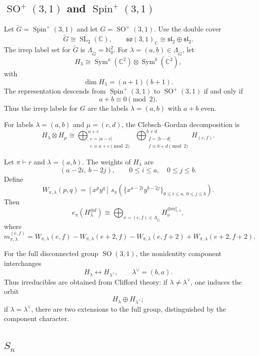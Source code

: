 \documentclass[11pt]{article}
\newcommand{\dsC}{\mathbb{C}}
\newcommand{\dsN}{\mathbb{N}}
\newcommand{\Sym}{\operatorname{Sym}}
\newcommand{\SO}{\operatorname{SO}}
\theoremstyle{definition}
\begin{document}
\subsection{\texorpdfstring{$\SO^+(3,1)$ and $\operatorname{Spin}^+(3,1)$}{SO+(3,1) and Spin+(3,1)}}\label{sec:examples-so31}

Let $\widetilde G = \operatorname{Spin}^+(3,1)$ and let $G = \SO^+(3,1)$.  Use the double cover
\[
  \widetilde G\cong \operatorname{SL}_2(\dsC),
  \qquad
  \mathfrak{so}(3,1)_{\dsC}\cong \mathfrak{sl}_2\oplus \mathfrak{sl}_2.
\]
The irrep label set for $\widetilde G$ is $\Lambda_{\widetilde G}=\dsN_0^2$. For $\lambda=(a,b)\in\Lambda_{\widetilde G}$, let
\[
  H_\lambda\cong \Sym^a(\dsC^2)\otimes
  \Sym^b(\overline{\dsC^2}),
\]
with
\[
  \dim H_\lambda=(a+1)(b+1).
\]
The representation descends from $\operatorname{Spin}^+(3,1)$ to $\SO^+(3,1)$ if and only if
\[
  a+b\equiv 0 \pmod 2.
\]
Thus the irrep labels for $G$ are the labels $\lambda=(a,b)$ with $a+b$ even.

For labels $\lambda=(a,b)$ and $\mu=(c,d)$, the Clebsch--Gordan decomposition is
\[
  H_\lambda\otimes H_\mu
  \cong
  \bigoplus_{\substack{e=|a-c|\\ e\equiv a+c \!\!\!\pmod 2}}^{a+c}
  \;
  \bigoplus_{\substack{f=|b-d|\\ f\equiv b+d \!\!\!\pmod 2}}^{b+d}
  H_{(e,f)}.
\]

Let $\pi\vdash r$ and $\lambda=(a,b)$. The weights of $H_\lambda$ are
\[
  (a-2i,\ b-2j),
  \qquad
  0\le i\le a,\quad 0\le j\le b.
\]
Define
\[
  W_{\pi,\lambda}(p,q)
  =
  [x^p y^q]\,
  s_\pi\!\left(
  \{x^{a-2i}y^{b-2j}\}_{0\le i\le a,\ 0\le j\le b}
  \right).
\]
Then
\[
  e_\pi(H_\lambda^{\otimes d})
  \cong
  \bigoplus_{\nu=(e,f)\in\Lambda_{\widetilde G}} H_\nu^{\oplus m_{\pi,\lambda}^{\nu}},
\]
where
\[
  m_{\pi,\lambda}^{(e,f)}
  =
  W_{\pi,\lambda}(e,f)
  -
  W_{\pi,\lambda}(e+2,f)
  -
  W_{\pi,\lambda}(e,f+2)
  +
  W_{\pi,\lambda}(e+2,f+2).
\]

For the full disconnected group $\SO(3,1)$, the nonidentity component interchanges
\[
  H_\lambda\longleftrightarrow H_{\lambda^\vee},
  \qquad
  \lambda^\vee=(b,a).
\]
Thus irreducibles are obtained from Clifford theory: if $\lambda\neq\lambda^\vee$, one induces the orbit
\[
  H_\lambda\oplus H_{\lambda^\vee};
\]
if $\lambda=\lambda^\vee$, there are two extensions to the full group, distinguished by the component character.

\subsection{\texorpdfstring{$S_n$}{S\_n}}\label{sec:examples-sn}
\end{document}
